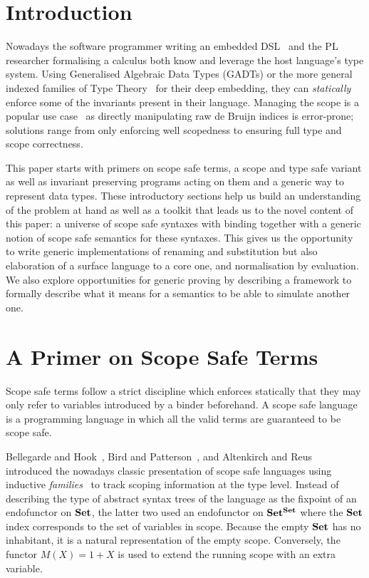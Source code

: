 
\section{Introduction}

Nowadays the software programmer writing an embedded DSL~\cite{hudak1996building}
and the PL researcher formalising a calculus both know and
leverage the host language's type system. Using Generalised
Algebraic Data Types (GADTs) or the more general indexed
families of Type Theory~\cite{dybjer1994inductive} for their deep embedding, they can
\emph{statically} enforce some of the invariants present in
their language. Managing the scope is a popular use case~\cite{altenkirch1999monadic} as
directly manipulating raw de Bruijn indices is error-prone;
solutions range from only enforcing well scopedness to ensuring
full type and scope correctness.

This paper starts with primers on scope safe terms, a scope and type
safe variant as well as invariant preserving programs acting on them
and a generic way to represent data types. These introductory sections
help us build an understanding of the problem at hand as well as a
toolkit that leads us to the novel content of this paper: a universe
of scope safe syntaxes with binding together with a generic notion of
scope safe semantics for these syntaxes.
This gives us the opportunity to write generic implementations of renaming
and substitution but also elaboration of a surface language to a core one,
and normalisation by evaluation. We also explore opportunities for
generic proving by describing a framework to formally describe what
it means for a semantics to be able to simulate another one.




\section{A Primer on Scope Safe Terms}\label{section:primer-term}

Scope safe terms follow a strict discipline which enforces statically
that they may only refer to variables introduced by a binder beforehand. A
scope safe language is a programming language in which all the valid terms
are guaranteed to be scope safe.

Bellegarde and Hook~\citeyear{BELLEGARDE1994287}, Bird and Patterson~\citeyear{bird_paterson_1999},
and Altenkirch and Reus~\citeyear{altenkirch1999monadic} introduced the
nowadays classic presentation of scope safe languages using inductive
\emph{families}~\cite{dybjer1994inductive} to track scoping information
at the type level. Instead of describing the type of abstract syntax trees
of the language as the fixpoint of an endofunctor on $\mathbf{Set}{}$, the latter two used
an endofunctor on $\mathbf{Set}{}^{\mathbf{Set}{}}$ where the $\mathbf{Set}{}$ index corresponds
to the set of variables in scope. Because the empty $\mathbf{Set}$ has no inhabitant,
it is a natural representation of the empty scope. Conversely, the functor
$M(X) = 1 + X$ is used to extend the running scope with an extra variable.

